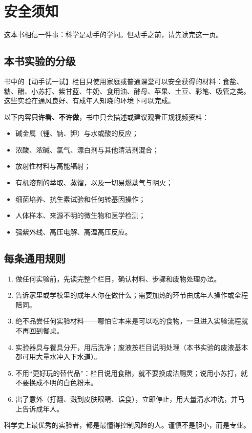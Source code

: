 \chapter*{安全须知}

这本书相信一件事：科学是动手的学问。但动手之前，请先读完这一页。

\section*{本书实验的分级}

书中的【动手试一试】栏目只使用家庭或普通课堂可以安全获得的材料：食盐、糖、醋、小苏打、紫甘蓝、牛奶、食用油、酵母、苹果、土豆、彩笔、吸管之类。这些实验在通风良好、有成年人知晓的环境下可以完成。

以下内容\textbf{只许看、不许做}，书中只会描述或建议观看正规视频资料：

\begin{itemize}[itemsep=2pt]
\item 碱金属（锂、钠、钾）与水或酸的反应；
\item 浓酸、浓碱、氯气、漂白剂与其他清洁剂混合；
\item 放射性材料与高能辐射；
\item 有机溶剂的萃取、蒸馏，以及一切易燃蒸气与明火；
\item 细菌培养、抗生素试验和任何转基因操作；
\item 人体样本、来源不明的微生物和医学检测；
\item 强紫外线、高压电解、高温高压反应。
\end{itemize}

\section*{每条通用规则}

\begin{enumerate}[itemsep=2pt]
\item 做任何实验前，先读完整个栏目，确认材料、步骤和废物处理办法。
\item 告诉家里或学校里的成年人你在做什么；需要加热的环节由成年人操作或全程陪同。
\item 绝不品尝任何实验材料——哪怕它本来是可以吃的食物，一旦进入实验流程就不再回到餐桌。
\item 实验器具与餐具分开，用后洗净；废液按栏目说明处理（本书实验的废液基本都可用大量水冲入下水道）。
\item 不用“更好玩的替代品”：栏目说用食醋，就不要换成洁厕灵；说用小苏打，就不要换成不明的白色粉末。
\item 出了意外（打翻、溅到皮肤眼睛、误食），立即停止，用大量清水冲洗，并马上告诉成年人。
\end{enumerate}

科学史上最优秀的实验者，都是最懂得控制风险的人。谨慎不是胆小，而是专业。
